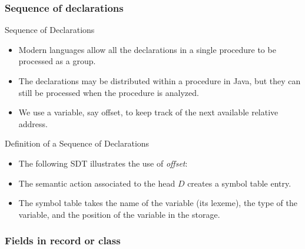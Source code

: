 \begin{bibunit}[apalike]
\subsubsection{Sequence of declarations}

\tableofcontentslide[sections={3-6},sectionstyle={show/shaded},subsectionstyle={show/shaded/hide},subsubsectionstyle={show/shaded/hide/hide}]

\begin{frame}{Sequence of Declarations}
	\begin{itemize}
	\item Modern languages allow all the declarations in a single procedure to be processed as a group.
	\vfill
	\item The declarations may be distributed within a procedure \eg in Java, but they can still be processed when the procedure is analyzed.
	\vfill
	\item We use a variable, say offset, to keep track of the next available relative address.
	\end{itemize}
\end{frame}

\begin{frame}{Definition of a Sequence of Declarations}
	\begin{itemize}
	\item The following SDT illustrates the use of \emph{offset}:
		\begin{sdd}
		\p{  ::= $\epsilon$}{}
		\end{sdd}
		\vfill
	\item The semantic action associated to the head $D$ creates a symbol table entry.
	\item The symbol table takes the name of the variable (its lexeme), the type of the variable, and the position of the variable in the storage.
	\end{itemize}
\end{frame}

\subsubsection{Fields in record or class}

\tableofcontentslide[sections={3-6},sectionstyle={show/shaded},subsectionstyle={show/shaded/hide},subsubsectionstyle={show/shaded/hide/hide}]


\end{bibunit}
